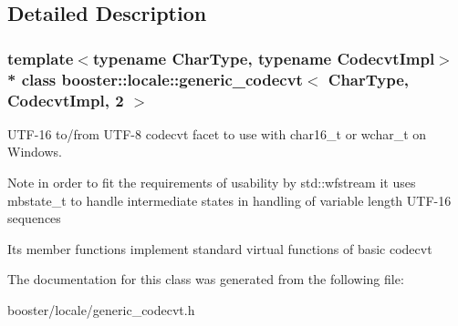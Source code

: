 \subsection{Detailed Description}
\subsubsection*{template$<$typename Char\+Type, typename Codecvt\+Impl$>$\\*
class booster\+::locale\+::generic\+\_\+codecvt$<$ Char\+Type, Codecvt\+Impl, 2 $>$}

U\+T\+F-\/16 to/from U\+T\+F-\/8 codecvt facet to use with char16\+\_\+t or wchar\+\_\+t on Windows. 

Note in order to fit the requirements of usability by std\+::wfstream it uses mbstate\+\_\+t to handle intermediate states in handling of variable length U\+T\+F-\/16 sequences

Its member functions implement standard virtual functions of basic codecvt 

The documentation for this class was generated from the following file\+:\begin{DoxyCompactItemize}
\item 
booster/locale/generic\+\_\+codecvt.\+h\end{DoxyCompactItemize}
